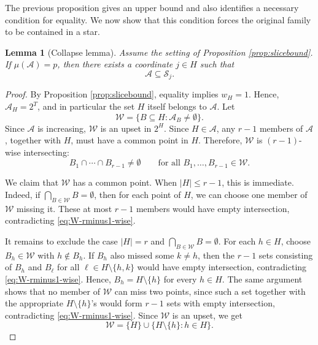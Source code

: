 \documentclass[11pt]{article}
\newtheorem{lemma}[theorem]{Lemma}
\begin{document}
The previous proposition gives an upper bound and also identifies a necessary
condition for equality.  We now show that this condition forces the original
family to be contained in a star.

\begin{lemma}[Collapse lemma]
\label{lem:collapse}
Assume the setting of Proposition  \ref{prop:slicebound}.  If $\mu(\mathcal{A})=p$, then there
exists a coordinate $j\in H$ such that
$$
 \mathcal{A}\subseteq\mathcal{S}_j.
$$
\end{lemma}
\begin{proof}
By Proposition \ref{prop:slicebound}, equality implies $w_H=1$.  Hence,
$\mathcal{A}_H=2^T$, and in particular the set $H$ itself belongs to $\mathcal{A}$.
Let
$$
 \mathcal{W}=\{B\subseteq H:\mathcal{A}_B\ne\emptyset\}.
$$
Since $\mathcal{A}$ is increasing, $\mathcal{W}$ is an upset in $2^H$.  Since
$H\in\mathcal{A}$, any $r-1$ members of $\mathcal{A}$, together with $H$, must have a
common point in $H$.  Therefore, $\mathcal{W}$ is $(r-1)$-wise intersecting:
\begin{equation}\label{eq:W-rminus1-wise}
 B_1\cap\cdots\cap B_{r-1}\ne\emptyset
 \qquad\text{for all }B_1,\ldots,B_{r-1}\in\mathcal{W}.
\end{equation}

We claim that $\mathcal{W}$ has a common point.  
When $|H|\le r-1$, this is immediate.  Indeed, if $\bigcap_{B\in\mathcal{W}}B=\emptyset$, then for each point of $H$, we can
choose one member of $\mathcal{W}$ missing it. These at most $r-1$ members would have
empty intersection, contradicting \eqref{eq:W-rminus1-wise}.

It remains to exclude the case $|H|=r$ and
$\bigcap_{B\in\mathcal{W}}B=\emptyset$.  For each $h\in H$, choose
$B_h\in\mathcal{W}$ with $h\notin B_h$.  If $B_h$ also missed some $k\ne h$, then
the $r-1$ sets consisting of $B_h$ and $B_\ell$ for all
$\ell\in H\setminus\{h,k\}$ would have empty intersection, contradicting
\eqref{eq:W-rminus1-wise}.  Hence, $B_h=H\setminus\{h\}$ for every $h\in H$.
The same argument shows that no member of $\mathcal W$ can miss two points, since such a set together with the appropriate $H\setminus\{h\}$'s would form $r-1$ sets with empty intersection, contradicting \eqref{eq:W-rminus1-wise}.
Since
$\mathcal{W}$ is an upset, we get
\begin{equation}\label{eq:threshold-support}
\mathcal{W}=\{H\}\cup\{H\setminus\{h\}:h\in H\}.
\end{equation}


\end{proof}
\end{document}
